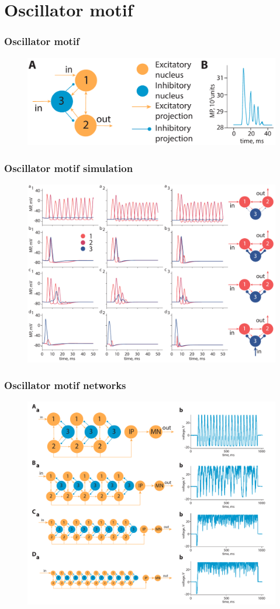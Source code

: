 \documentclass[12pt, aspectratio=169]{beamer}
\begin{document}
\section{Oscillator motif}
\begin{frame}
  \frametitle{Oscillator motif}
  \begin{figure}
    \includegraphics[width=0.8\linewidth]{OM_2}
  \end{figure}
\end{frame}
\begin{frame}
  \frametitle{Oscillator motif simulation}
  \begin{figure}
    \includegraphics[width=0.7\linewidth]{OM_sim}
  \end{figure}
\end{frame}
\begin{frame}
  \frametitle{Oscillator motif networks}
  \begin{figure}
    \includegraphics[width=0.65\linewidth]{OM_osc}
  \end{figure}
\end{frame}
\end{document}
